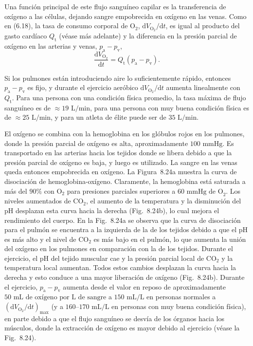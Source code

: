 \documentclass[12pt]{book}
\begin{document}
Una función principal de este flujo sanguíneo capilar es la transferencia de oxígeno a las células, dejando sangre empobrecida en oxígeno en las venas. Como en (6.18), la tasa de consumo corporal de $\text{O}_2$, $\mathrm{d}V_{\text{O}_2}/\mathrm{d}t$, es igual al producto del gasto cardíaco $Q_{\text{t}}$ (véase más adelante) y la diferencia en la presión parcial de oxígeno en las arterias y venas, $p_{\text{a}} - p_{\text{v}}$,
\begin{equation}
\frac{\mathrm{d}V_{\text{O}_2}}{\mathrm{d}t} = Q_{\text{t}} (p_{\text{a}} - p_{\text{v}}).
\label{eq:828}
\end{equation}

Si los pulmones están introduciendo aire lo suficientemente rápido, entonces $p_{\text{a}} - p_{\text{v}}$ es fijo, y durante el ejercicio aeróbico $\mathrm{d}V_{\text{O}_2}/\mathrm{d}t$ aumenta linealmente con $Q_{\text{t}}$. Para una persona con una condición física promedio, la tasa máxima de flujo sanguíneo es de ${\approx}19\text{ L/min}$, para una persona con muy buena condición física es de ${\approx}25\text{ L/min}$, y para un atleta de élite puede ser de $35\text{ L/min}$.

El oxígeno se combina con la hemoglobina en los glóbulos rojos en los pulmones, donde la presión parcial de oxígeno es alta, aproximadamente $100\text{ mmHg}$. Es transportado en las arterias hacia los tejidos donde se libera debido a que la presión parcial de oxígeno es baja, y luego es utilizado. La sangre en las venas queda entonces empobrecida en oxígeno. La Figura~8.24a muestra la curva de disociación de hemoglobina-oxígeno. Claramente, la hemoglobina está saturada a más del $90\%$ con $\text{O}_2$ para presiones parciales superiores a $60\text{ mmHg de O}_2$. Los niveles aumentados de $\text{CO}_2$, el aumento de la temperatura y la disminución del pH desplazan esta curva hacia la derecha (Fig.~8.24b), lo cual mejora el rendimiento del cuerpo. En la Fig.~8.24a se observa que la curva de disociación para el pulmón se encuentra a la izquierda de la de los tejidos debido a que el pH es más alto y el nivel de $\text{CO}_2$ es más bajo en el pulmón, lo que aumenta la unión del oxígeno en los pulmones en comparación con la de los tejidos. Durante el ejercicio, el pH del tejido muscular cae y la presión parcial local de $\text{CO}_2$ y la temperatura local aumentan. Todos estos cambios desplazan la curva hacia la derecha y esto conduce a una mayor liberación de oxígeno (Fig.~8.24b). Durante el ejercicio, $p_{\text{a}} - p_{\text{v}}$ aumenta desde el valor en reposo de aproximadamente $50\text{ mL de oxígeno por L de sangre}$ a $150\text{ mL/L}$ en personas normales a $(\mathrm{d}V_{\text{O}_2}/\mathrm{d}t)_{\text{max}}$ (y a $160\text{--}170\text{ mL/L}$ en personas con muy buena condición física), en parte debido a que el flujo sanguíneo se desvía de los órganos hacia los músculos, donde la extracción de oxígeno es mayor debido al ejercicio (véase la Fig.~8.24).
\end{document}
